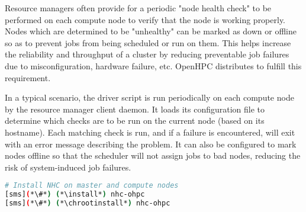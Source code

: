 Resource managers often provide for a periodic "node health check" to be
performed on each compute node to verify that the node is working
properly. Nodes which are determined to be "unhealthy" can be marked as down or
offline so as to prevent jobs from being scheduled or run on them. This helps
increase the reliability and throughput of a cluster by reducing preventable
job failures due to misconfiguration, hardware failure, etc. OpenHPC
distributes \nhc{} to fulfill this requirement.

In a typical scenario, the \nhc{} driver script is run periodically on each compute
node by the resource manager client daemon. It loads its
configuration file to determine which checks are to be run on the current node
(based on its hostname). Each matching check is run, and if a failure is
encountered, \nhc{} will exit with an error message describing the problem. It can
also be configured to mark nodes offline so that the scheduler will not assign
jobs to bad nodes, reducing the risk of system-induced job failures. 

\begin{lstlisting}[language=bash,keywords={},upquote=true]
# Install NHC on master and compute nodes
[sms](*\#*) (*\install*) nhc-ohpc
[sms](*\#*) (*\chrootinstall*) nhc-ohpc
\end{lstlisting}

